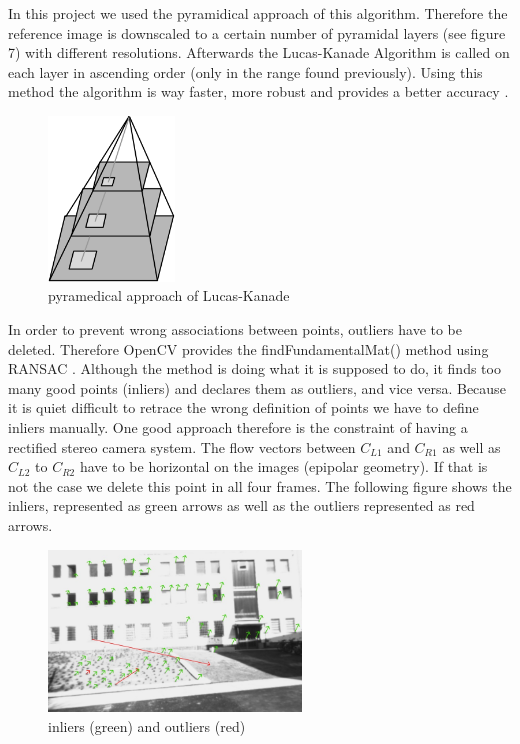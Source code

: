 \documentclass[11pt]{article}
\begin{document}
	In this project we used the pyramidical approach of this algorithm. Therefore the reference image is downscaled to a certain number of pyramidal layers (see figure 7) with different resolutions. Afterwards the Lucas-Kanade Algorithm is called on each layer in ascending order (only in the range found previously). Using this method the algorithm is way faster, more robust and provides a better accuracy \cite{Lucas_Kanade_TU_dresden}.

	\begin{figure}[H]
		\centering
		\includegraphics[width=0.3\textwidth]{images/pyramidical.png}
		\caption{pyramedical approach of Lucas-Kanade}
	\end{figure}
	
	In order to prevent wrong associations between points, outliers have to be deleted. Therefore OpenCV provides the findFundamentalMat() method using RANSAC \cite{findFundamentalMat}. Although the method is doing what it is supposed to do, it finds too many good points (inliers) and declares them as outliers, and vice versa. Because it is quiet difficult to retrace the wrong definition of points we have to define inliers manually. One good approach therefore is the constraint of having a rectified stereo camera system. The flow vectors between $C_{L1}$ and $C_{R1}$ as well as $C_{L2}$ to $C_{R2}$ have to be horizontal on the images (epipolar geometry). If that is not the case we delete this point in all four frames. The following figure shows the inliers, represented as green arrows as well as the outliers represented as red arrows.
	
	\begin{figure}[H]
		\centering
		\includegraphics[width=0.6\textwidth]{images/inlier_outlier3.jpg}
		\caption{inliers (green) and outliers (red)}
	\end{figure}
	
\end{document}
